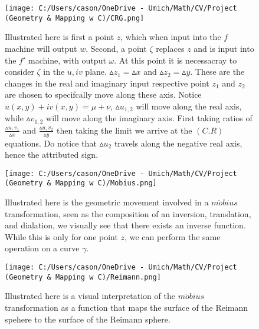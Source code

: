 \documentclass[a4paper,man,natbib]{apa6}
\begin{document}
\begin{figure}

      \centering
      \texttt{[image: C:/Users/cason/OneDrive - Umich/Math/CV/Project (Geometry \& Mapping w C)/CRG.png]}
      \caption{\label{C:/Users/cason/OneDrive - Umich/Math/CV/Project (Geometry & Mapping w C)/CRG.png}
      Illustrated here is first a point $ z $, which when input into the $ f $ machine will output $ w $. 
      Second, a point $ \zeta $ replaces $ z $ and is input into the $ f' $ machine, with output $ \omega $. 
      At this point it is necessacray to consider $ \zeta $ in the $ u,iv $ plane. 
      $ \vartriangle z_{1} = \vartriangle x $ and $ \vartriangle z_{2} = \vartriangle y $. 
      These are the changes in the real and imaginary input respective point $ z_{1} $ and $ z_{2} $ are chosen to specifcally move along these axis. 
      Notice $ u(x,y) + iv(x,y) = \mu + \nu $, $ \vartriangle u_{1,2} $ will move along the real axis, while $ \vartriangle v_{1,2} $ will move along the imaginary axis.
      First taking ratios of $ \frac{\vartriangle u,v_{1}}{\vartriangle x} $ and $ \frac{\vartriangle u,v_{2}}{\vartriangle y} $ then taking the limit we arrive at the $ (C.R) $ equations.
      Do notice that $ \vartriangle u_{2} $ travels along the negative real axis, hence the attributed sign.} 

\end{figure}

\begin{figure}

      \centering
      \texttt{[image: C:/Users/cason/OneDrive - Umich/Math/CV/Project (Geometry \& Mapping w C)/Mobius.png]}
      \caption{\label{C:/Users/cason/OneDrive - Umich/Math/CV/Project (Geometry & Mapping w C)/Mobius.png}
      Illustrated here is the geometric movement involved in a $ m\ddot{o}bius $ transformation, 
      seen as the composition of an inversion, translation, and dialation, we visually see that there exists an inverse function. 
      While this is only for one point $ z $, we can perform the same operation on a curve $ \gamma $.}

\end{figure}

\begin{figure}

      \centering
      \texttt{[image: C:/Users/cason/OneDrive - Umich/Math/CV/Project (Geometry \& Mapping w C)/Reimann.png]}
      \caption{\label{C:/Users/cason/OneDrive - Umich/Math/CV/Project (Geometry & Mapping w C)/Reimann.png}
      Illustrated here is a visual interpretation of the $ m\ddot{o}bius $ transformation 
      as a function that maps the surface of the Reimann spehere to the surface of the Reimann sphere.}

\end{figure}
\end{document}
